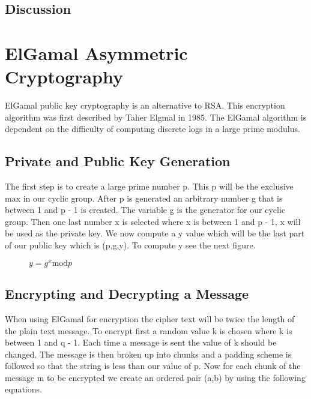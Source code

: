 \documentclass[conference]{IEEEtran}
\begin{document}
\subsection{Discussion}


\color{black}


\section{ElGamal Asymmetric Cryptography}
ElGamal public key cryptography is an alternative to RSA. This encryption algorithm was first described by Taher Elgmal in 1985. The ElGamal algorithm is dependent on the difficulty of computing discrete logs in a large prime modulus.

\subsection{Private and Public Key Generation}
The first step is to create a large prime number p. This p will be the exclusive max in our cyclic group. After p is generated an arbitrary number g that is between 1 and p - 1 is created. The variable g is the generator for our cyclic group. Then one last number x is selected where x is between 1 and p - 1, x will be used as the private key. We now compute a y value which will be the last part of our public key which is (p,g,y). To compute y see the next figure.

\begin{figure}[h]
	\begin{center}
		$y={g}^{x}\mathrm{mod}p$
	\end{center}	
\end{figure}


\subsection{Encrypting and Decrypting a Message}

When using ElGamal for encryption the cipher text will be twice the length of the plain text message. 
To encrypt first a random value k is chosen where k is between 1 and q - 1. Each time a message is sent the value of k should be changed. The message is then broken up into chunks and a padding scheme is followed so that the string is less than our value of p. Now for each chunk of the message m to be encrypted we create an ordered pair (a,b) by using the following equations.
\end{document}
